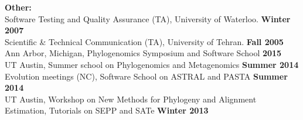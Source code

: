 \documentclass[margin,line,letterpaper]{resume}
\begin{document}
\begin{resume}
    \textbf{Other:}\vspace{2mm}\\\vspace{1mm}%
    Software Testing and Quality Assurance (TA), University of Waterloo.  \hfill \textbf{Winter 2007}\\
    Scientific \& Technical Communication (TA), University of Tehran.  \hfill \textbf{Fall 2005}
%
    Ann Arbor, Michigan, Phylogenomics Symposium and Software School \hfill \textbf{2015}\\
    UT Austin, Summer school on Phylogenomics and Metagenomics \hfill \textbf{Summer 2014}\\
    Evolution meetings (NC), Software School on ASTRAL and PASTA \hfill \textbf{Summer 2014}\\
    UT Austin, Workshop on New Methods for Phylogeny and Alignment Estimation, 
    Tutorials on SEPP and SATe \hfill \textbf{Winter 2013}
%

    
    

\end{resume}
\end{document}
